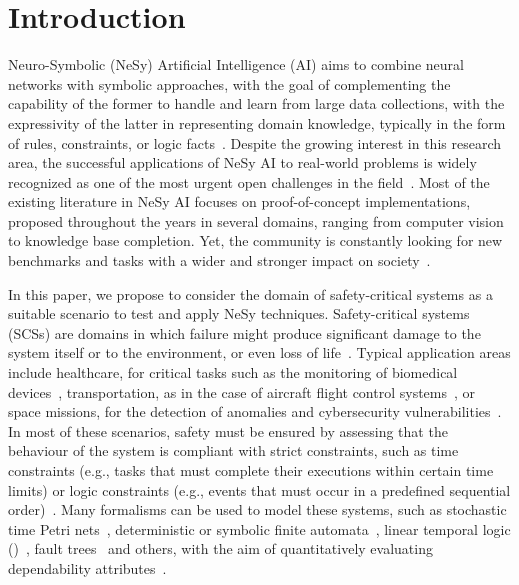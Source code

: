 \section{Introduction}\label{ansya:sec:intro}

Neuro-Symbolic (NeSy) Artificial Intelligence (AI) aims to combine neural networks with symbolic approaches, with the goal of complementing the capability of the former to handle and learn from large data collections, with the expressivity of the latter in representing domain knowledge, typically in the form of rules, constraints, or logic facts~\cite{garcez2023neurosymbolic}. Despite the growing interest in this research area, %
the successful applications of NeSy AI to real-world problems is widely recognized as one of the most urgent open challenges in the field~\cite{deraedt2021statistical}. 
%
Most of the existing literature in NeSy AI focuses on proof-of-concept implementations, proposed throughout the years in several domains, ranging from computer vision to knowledge base completion. Yet, the community is constantly looking for new benchmarks and tasks with a wider and stronger impact on society~\cite{manhaeve2024benchmarking}.

In this paper, we propose to consider the domain of safety-critical systems as a suitable scenario to test and apply NeSy techniques. Safety-critical systems (SCSs) are domains in which failure might produce significant damage to the system itself or to the environment, or even loss of life~\cite{knight2002safety}. Typical application areas include healthcare, for critical tasks such as the monitoring of biomedical devices~\cite{vakhter2022threat}, transportation, as in the case of aircraft flight control systems~\cite{stolzer2023safety}, or space missions, for the detection of anomalies and cybersecurity vulnerabilities~\cite{vessels2019cybersecurity}. In most of these scenarios, safety must be ensured by assessing that the behaviour of the system is compliant with strict constraints, such as time constraints (e.g., tasks that must complete their executions within certain time limits) or logic constraints (e.g., events that must occur in a predefined sequential order)~\cite{graydon2014realistic,favaro2018application}. Many formalisms can be used to model these systems, such as stochastic time Petri nets~\cite{carnevali2012quantitative}, deterministic or symbolic finite automata~\cite{giantamidis2020efficient}, linear temporal logic (\LTL)~\cite{ma2010approach}, fault trees~\cite{roth2013modeling,ruijters2015fault} and others, with the aim of quantitatively evaluating  dependability attributes~\cite{maurya2020reliability,carnevali2025faultflow}.

